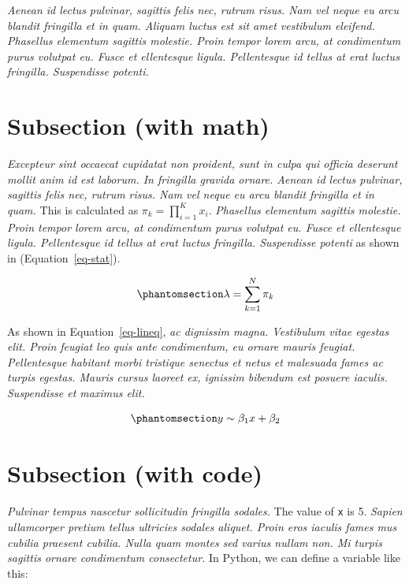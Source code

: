 \documentclass[
  a4paper,
]{scrbook}
\begin{document}
\emph{Aenean id lectus pulvinar, sagittis felis nec, rutrum risus. Nam
vel neque eu arcu blandit fringilla et in quam. Aliquam luctus est sit
amet vestibulum eleifend. Phasellus elementum sagittis molestie. Proin
tempor lorem arcu, at condimentum purus volutpat eu. Fusce et
ellentesque ligula. Pellentesque id tellus at erat luctus fringilla.
Suspendisse potenti.}

\section{Subsection (with math)}\label{subsection-with-math}

\emph{Excepteur sint occaecat cupidatat non proident, sunt in culpa qui
officia deserunt mollit anim id est laborum. In fringilla gravida
ornare. Aenean id lectus pulvinar, sagittis felis nec, rutrum risus. Nam
vel neque eu arcu blandit fringilla et in quam.} This is calculated as
\(\pi_k = \prod_{i=1}^K x_i\). \emph{Phasellus elementum sagittis
molestie. Proin tempor lorem arcu, at condimentum purus volutpat eu.
Fusce et ellentesque ligula. Pellentesque id tellus at erat luctus
fringilla. Suspendisse potenti} as shown in (Equation~\ref{eq-stat}).

\begin{equation}\phantomsection\label{eq-stat}{
\lambda = \sum_{k=1}^N \pi_k
}\end{equation}

As shown in Equation~\ref{eq-lineq}, \emph{ac dignissim magna.
Vestibulum vitae egestas elit. Proin feugiat leo quis ante condimentum,
eu ornare mauris feugiat. Pellentesque habitant morbi tristique senectus
et netus et malesuada fames ac turpis egestas. Mauris cursus laoreet ex,
ignissim bibendum est posuere iaculis. Suspendisse et maximus elit.}

\begin{equation}\phantomsection\label{eq-lineq}{
y \sim \beta_1 x + \beta_2
}\end{equation}

\section{Subsection (with code)}\label{subsection-with-code}

\emph{Pulvinar tempus nascetur sollicitudin fringilla sodales.} The
value of \texttt{x} is 5. \emph{Sapien ullamcorper pretium tellus
ultricies sodales aliquet. Proin eros iaculis fames mus cubilia praesent
cubilia. Nulla quam montes sed varius nullam non. Mi turpis sagittis
ornare condimentum consectetur.} In Python, we can define a variable
like this:
\end{document}
